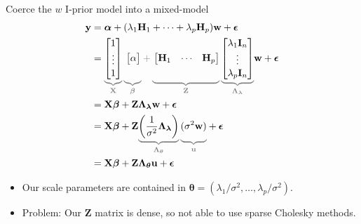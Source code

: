 \documentclass{beamer}\usepackage[]{graphicx}\usepackage[]{color}
\begin{document}
\begin{frame}{Coerce the $w$ I-prior model into a mixed-model}
	\vspace{-5mm}
	\begin{align*}
	\mathbf y &= \boldsymbol{\alpha} + (\lambda_1\mathbf H_1 + \dots + \lambda_p\mathbf H_p) \mathbf w + \boldsymbol{\epsilon} \\
	&=
	{\color{gray}
	\underbrace{ \color{black}
	\begin{bmatrix}
		1 \\
		\vdots \\
		1
	\end{bmatrix}
	}_{\mathbf X}
	\underbrace{\color{black} \vphantom{\begin{bmatrix} 1 \\ \vdots \\ 1 \end{bmatrix}}
	\begin{bmatrix}
		\alpha
	\end{bmatrix}
	}_{\boldsymbol{\beta}}
	+
	\underbrace{\color{black} \vphantom{\begin{bmatrix} 1 \\ \vdots \\ 1 \end{bmatrix}}
	\begin{bmatrix}
		\mathbf H_1	&\cdots	&\mathbf H_p
	\end{bmatrix}
	}_{\mathbf Z}
	\underbrace{\color{black}
	\begin{bmatrix}
		\lambda_1\mathbf I_n \\
		\vdots \\
		\lambda_p\mathbf I_n
	\end{bmatrix}
	}_{\boldsymbol{\Lambda}_{\boldsymbol{\lambda}}}
	}
	\mathbf w + \boldsymbol{\epsilon} \\
	&= \mathbf X \boldsymbol{\beta} + \mathbf Z \boldsymbol{\Lambda}_{\boldsymbol{\lambda}} \mathbf w + \boldsymbol{\epsilon} \\
	&= \mathbf X \boldsymbol{\beta} + \mathbf Z
		{\color{gray}
		\underbrace{\color{black} \left(\frac{1}{\sigma^2}\boldsymbol{\Lambda}_{\boldsymbol{\lambda}}\right)}_{\boldsymbol{\Lambda}_{\boldsymbol{\theta}}}
		\underbrace{\color{black} \vphantom{\left(\frac{1}{\sigma^2}\boldsymbol{\Lambda}_{\boldsymbol{\lambda}}\right)}
		(\sigma^2 \mathbf w)}_{\mathbf u}
		} + \boldsymbol{\epsilon} \\
	&=  \mathbf X \boldsymbol{\beta} + \mathbf Z \boldsymbol{\Lambda}_{\boldsymbol{\theta}} \mathbf u + \boldsymbol{\epsilon}
	\end{align*}

	\begin{itemize}
		\item Our scale parameters are contained in $\boldsymbol{\theta}=(\lambda_1/\sigma^2, \dots, \lambda_p/\sigma^2)$.
		\item Problem: Our $\mathbf Z$ matrix is dense, so not able to use sparse Cholesky methods.
	\end{itemize}
\end{frame}
\end{document}
